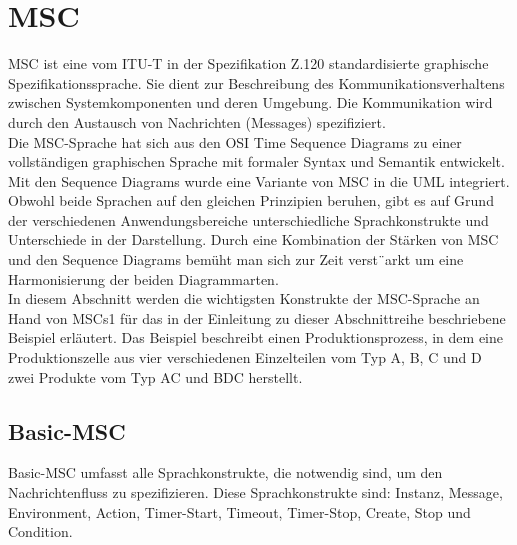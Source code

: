 
\section{MSC}
\label{sc:MSC}
\acs{MSC} ist eine vom \ac{ITU-T} in der Spezifikation Z.120
standardisierte graphische Spezifikationssprache. Sie dient
zur Beschreibung des Kommunikationsverhaltens zwischen
Systemkomponenten und deren Umgebung. Die Kommunikation
wird durch den Austausch von Nachrichten (Messages)
spezifiziert.\cite{MT009} \\
Die \ac{MSC}-Sprache hat sich aus den \ac{OSI} Time Sequence
Diagrams zu einer vollständigen graphischen Sprache
mit formaler Syntax und Semantik entwickelt.
Mit den Sequence Diagrams wurde eine Variante von \ac{MSC}
in die \ac{UML} integriert. Obwohl beide Sprachen auf den
gleichen Prinzipien beruhen, gibt es auf Grund der verschiedenen
Anwendungsbereiche unterschiedliche Sprachkonstrukte
und Unterschiede in der Darstellung. Durch eine
Kombination der Stärken von \ac{MSC} und den Sequence
Diagrams bemüht man sich zur Zeit verst¨arkt um eine Harmonisierung der beiden Diagrammarten.\\
In diesem Abschnitt werden die wichtigsten Konstrukte der
MSC-Sprache an Hand von MSCs1 für das in der Einleitung zu dieser Abschnittreihe beschriebene Beispiel erläutert. Das Beispiel beschreibt einen Produktionsprozess, in dem eine Produktionszelle aus vier verschiedenen Einzelteilen vom Typ A, B, C und D zwei Produkte vom Typ AC und BDC herstellt.


\subsection{Basic-MSC}
Basic-MSC umfasst alle Sprachkonstrukte, die notwendig sind, um den Nachrichtenfluss zu spezifizieren. Diese
Sprachkonstrukte sind: Instanz, Message, Environment, Action, Timer-Start, Timeout, Timer-Stop, Create, Stop und
Condition.\cite{MT009} \\


